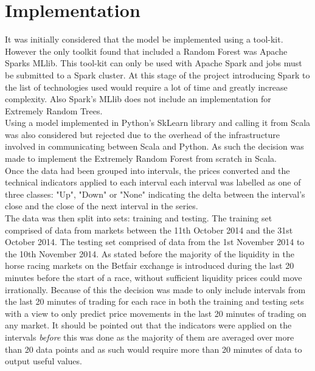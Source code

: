 	\section{Implementation}
		It was initially considered that the model be implemented using a tool-kit. However the only toolkit found that included a Random Forest was Apache Sparks MLlib\cite{spark}. This tool-kit can only be used with Apache Spark and jobs must be submitted to a Spark cluster. At this stage of the project introducing Spark to the list of technologies used would require a lot of time and greatly increase complexity. Also Spark's MLlib does not include an implementation for Extremely Random Trees.\\ 
		
		Using a model implemented in Python's SkLearn library\cite{Sklearn} and calling it from Scala was also considered but rejected due to the overhead of the infrastructure involved in communicating between Scala and Python\cite{CallingPythonFromScala}. As such the decision was made to implement the Extremely Random Forest from scratch in Scala.\\
			
		
		
		Once the data had been grouped into intervals, the prices converted and the technical indicators applied to each interval each interval was labelled as one of three classes: "Up", "Down" or "None" indicating the delta between the interval's close and the close of the next interval in the series.\\
		
		The data was then split into sets: training and testing. The training set comprised of data from markets between the 11th October 2014 and the 31st October 2014. The testing set comprised of data from the 1st November 2014 to the 10th November 2014. As stated before the majority of the liquidity in the horse racing markets on the Betfair exchange is introduced during the last 20 minutes before the start of a race, without sufficient liquidity prices could move irrationally. Because of this the decision was made to only include intervals from the last 20 minutes of trading for each race in both the training and testing sets with a view to only predict price movements in the last 20 minutes of trading on any market. It should be pointed out that the indicators were applied on the intervals \textit{before} this was done as the majority of them are averaged over more than 20 data points and as such would require more than 20 minutes of data to output useful values.

